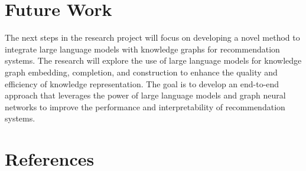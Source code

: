 \documentclass{article}
\begin{document}
\section{Future Work}

The next steps in the research project will focus on developing a novel method to integrate large language models with knowledge graphs for recommendation systems. The research will explore the use of large language models for knowledge graph embedding, completion, and construction to enhance the quality and efficiency of knowledge representation. The goal is to develop an end-to-end approach that leverages the power of large language models and graph neural networks to improve the performance and interpretability of recommendation systems.


\section{References}
\printbibliography
\clearpage

\appendix
\end{document}
